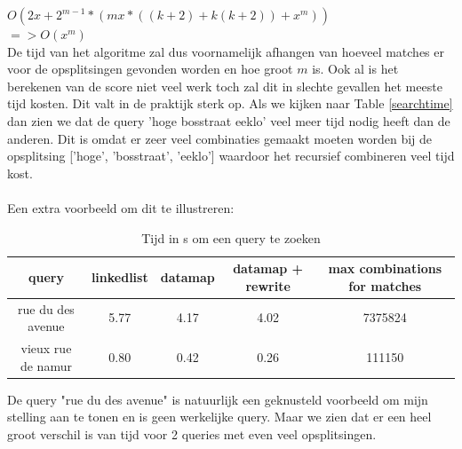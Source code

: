 \documentclass[11pt]{article}
\begin{document}
$O(2x + 2^{m-1}*(mx*((k+2) + k(k+2)) + x^m))$\\
$  => O(x^m)$\\

De tijd van het algoritme zal dus voornamelijk afhangen van hoeveel matches er voor de opsplitsingen gevonden worden en hoe groot $m$ is. Ook al is het berekenen van de score niet veel werk toch zal dit in slechte gevallen het meeste tijd kosten. Dit valt in de praktijk sterk op. Als we kijken naar Table \ref{searchtime} dan zien we dat de query 'hoge bosstraat eeklo' veel meer tijd nodig heeft dan de anderen. Dit is omdat er zeer veel combinaties gemaakt moeten worden bij de opsplitsing ['hoge', 'bosstraat', 'eeklo'] waardoor het recursief combineren veel tijd kost.\\
\\
Een extra voorbeeld om dit te illustreren:
\begin{table}[H]
        \centering
        \begin{tabular}{ |c|c|c|c|c| }
                \hline
                query & linkedlist & datamap & datamap + rewrite & max combinations for matches\\
                \hline
                rue du des avenue  & 5.77 & 4.17 & 4.02 & 7375824\\
                vieux rue de namur & 0.80 & 0.42 & 0.26 & 111150\\
                \hline
        \end{tabular}
        \caption{Tijd in s om een query te zoeken}
\end{table}
De query "rue du des avenue" is natuurlijk een geknusteld voorbeeld om mijn stelling aan te tonen en is geen werkelijke query. Maar we zien dat er een heel groot verschil is van tijd voor 2 queries met even veel opsplitsingen.
\end{document}
